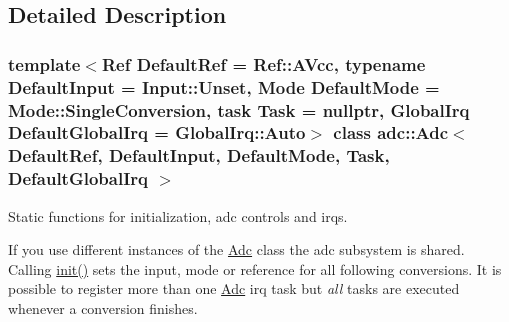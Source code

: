 \subsection{Detailed Description}
\subsubsection*{template$<$Ref Default\+Ref = Ref\+::\+A\+Vcc, typename Default\+Input = Input\+::\+Unset, Mode Default\+Mode = Mode\+::\+Single\+Conversion, task Task = nullptr, Global\+Irq Default\+Global\+Irq = Global\+Irq\+::\+Auto$>$\newline
class adc\+::\+Adc$<$ Default\+Ref, Default\+Input, Default\+Mode, Task, Default\+Global\+Irq $>$}

Static functions for initialization, adc controls and irqs. 

If you use different instances of the \hyperlink{classadc_1_1Adc}{Adc} class the adc subsystem is shared. Calling \hyperlink{classadc_1_1Adc_a146fe898e16915e9b344019c59cdcfa3}{init()} sets the input, mode or reference for all following conversions. It is possible to register more than one \hyperlink{classadc_1_1Adc}{Adc} irq task but {\itshape all} tasks are executed whenever a conversion finishes.


